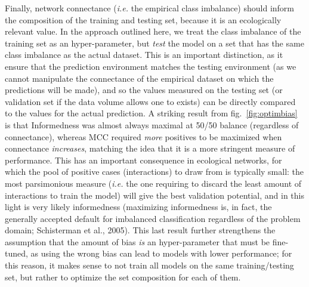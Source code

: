 \documentclass[10pt,oneside]{article}
\begin{document}
Finally, network connectance (\emph{i.e.} the empirical class imbalance)
should inform the composition of the training and testing set, because
it is an ecologically relevant value. In the approach outlined here, we
treat the class imbalance of the training set as an hyper-parameter, but
\emph{test} the model on a set that has the same class imbalance as the
actual dataset. This is an important distinction, as it ensure that the
prediction environment matches the testing environment (as we cannot
manipulate the connectance of the empirical dataset on which the
predictions will be made), and so the values measured on the testing set
(or validation set if the data volume allows one to exists) can be
directly compared to the values for the actual prediction. A striking
result from fig.~\ref{fig:optimbias} is that Informedness was almost
always maximal at 50/50 balance (regardless of connectance), whereas MCC
required \emph{more} positives to be maximized when connectance
\emph{increases}, matching the idea that it is a more stringent measure
of performance. This has an important consequence in ecological
networks, for which the pool of positive cases (interactions) to draw
from is typically small: the most parsimonious measure (\emph{i.e.} the
one requiring to discard the least amount of interactions to train the
model) will give the best validation potential, and in this light is
very likely informedness (maximizing informedness is, in fact, the
generally accepted default for imbalanced classification regardless of
the problem domain; Schisterman et al., 2005). This last result further
strengthens the assumption that the amount of bias \emph{is} an
hyper-parameter that must be fine-tuned, as using the wrong bias can
lead to models with lower performance; for this reason, it makes sense
to not train all models on the same training/testing set, but rather to
optimize the set composition for each of them.
\end{document}
